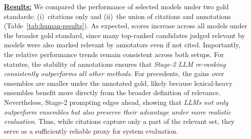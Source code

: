 \vspace{1mm}
\noindent\underline{\textbf{Results:}} We compared the performance of selected models under two gold standards: (i)~citations only and (ii)~the union of citations and annotations (Table~\ref{tab:human-results}). As expected, scores increase across all models under the broader gold standard, since many top-ranked candidates judged relevant by models were also marked relevant by annotators even if not cited. Importantly, the relative performance trends remain consistent across both setups. For statutes, the stability of annotations ensures that \textit{Stage-2 LLM re-ranking consistently outperforms all other methods}. For precedents, the gains over ensembles are smaller under the annotated gold, likely because lexical-heavy ensembles benefit more directly from the broader definition of relevance. Nevertheless, Stage-2 prompting edges ahead, showing that \textit{LLMs not only outperform ensembles but also preserve their advantage under more realistic evaluation}. Thus, while citations capture only a part of the relevant set, they serve as a sufficiently reliable proxy for system evaluation.


